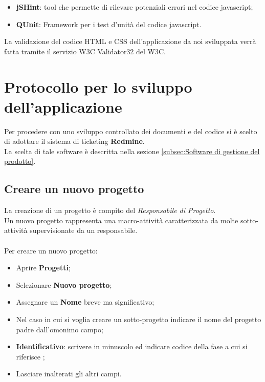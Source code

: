   \begin{itemize}
  \item \textbf{jSHint}: tool che permette di rilevare potenziali errori nel codice javascript;
  \item \textbf{QUnit}: Framework per i test d'unit\`{a} del codice javascript.
  \end{itemize}





La validazione del codice HTML e CSS dell’applicazione da noi sviluppata verr\`{a}
fatta tramite il servizio W3C Validator32 del W3C.


\section{Protocollo per lo sviluppo dell'applicazione} 
Per procedere con uno sviluppo controllato dei documenti e del codice si \`{e} scelto di adottare il sistema di ticketing \textbf{Redmine}.\\ 
La scelta di tale software \`{e} descritta nella sezione \ref{subsec:Software di gestione del prodotto}.

\subsection{Creare un nuovo progetto} 

La creazione di un progetto \`{e} compito del \emph{Responsabile di Progetto}.\\ 
Un nuovo progetto rappresenta una macro-attivit\`{a} caratterizzata da molte sotto-attivit\`{a} 
supervisionate da un responsabile.\\\\ 
Per creare un nuovo progetto:
\begin{itemize}
\item Aprire \textbf{Progetti}; 
\item Selezionare \textbf{Nuovo progetto}; 
\item Assegnare un \textbf{Nome} breve ma significativo; 
\item Nel caso in cui si voglia creare un sotto-progetto indicare il nome del progetto padre dall’omonimo campo; 
\item \textbf{Identificativo}: scrivere in minuscolo ed indicare codice della fase a cui si riferisce ;
\item Lasciare inalterati gli altri campi. 
\end{itemize}
 
